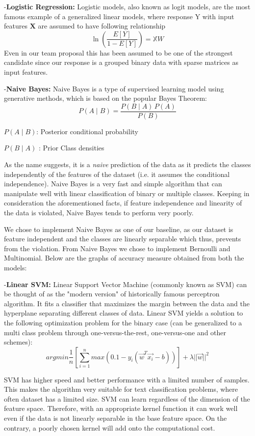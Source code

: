 \documentclass[comsoc,conference]{IEEEtran}
\begin{document}
-\textbf{Logistic Regression:} Logistic models, also known as logit models, are the most famous example of a generalized linear models, where response Y with input features $\mathbf{X}$ are assumed to have following relationship
\[\ln(\frac{E[Y]}{1-E[Y]}) = \mathbb{X}W\]
Even in our team proposal this has been assumed to be one of the strongest candidate since our response is a grouped binary data with sparse matrices as input features.

-\textbf{Naive Bayes:} Naive Bayes is a type of supervised learning model using generative methods, which is based on the popular Bayes Theorem: 
$$ P(A \mid B) = \frac{P(B \mid A) \, P(A)}{P(B)} $$

$ P(A \mid B)$: Posterior conditional probability 


${P(B \mid A) }$ : Prior Class densities

As the name suggests, it is a \textit{naive} prediction of the data as it predicts the classes independently of the features of the dataset (i.e. it assumes the conditional independence). Naive Bayes is a very fast and simple algorithm that can manipulate well with linear classification of binary or multiple classes. Keeping in consideration the aforementioned facts, if feature independence and linearity of the data is violated, Naive Bayes tends to perform very poorly. 


We chose to implement Naive Bayes as one of our baseline, as our dataset is feature independent and the classes are linearly separable which thus, prevents from the violation. From Naive Bayes we chose to implement Bernoulli and Multinomial. Below are the graphs of accuracy measure obtained from both the models:




-\textbf{Linear SVM:} Linear Support Vector Machine (commonly known as SVM) can be thought of as the "modern version" of historically famous perceptron algorithm. It fits a classifier that maximizes the margin between the data and the hyperplane separating different classes of data. Linear SVM yields a solution to the following optimization problem for the binary case (can be generalized to a multi class problem through one-versus-the-rest, one-versus-one and other schemes):
\[
argmin \frac{1}{n} [\sum_{i=1}^n max(0. 1-y_i(\vec{w}^T\vec{x_i}-b))] + \lambda||\vec{w}||^2
\]

SVM has higher speed and better performance with a limited number of samples. This makes the algorithm very suitable for text classification problems, where often dataset has a limited size. SVM can learn regardless of the dimension of the feature space. Therefore, with an appropriate kernel function it can work well even if the data is not linearly separable in the base feature space. On the contrary, a poorly chosen kernel will add onto the computational cost. 
\end{document}
